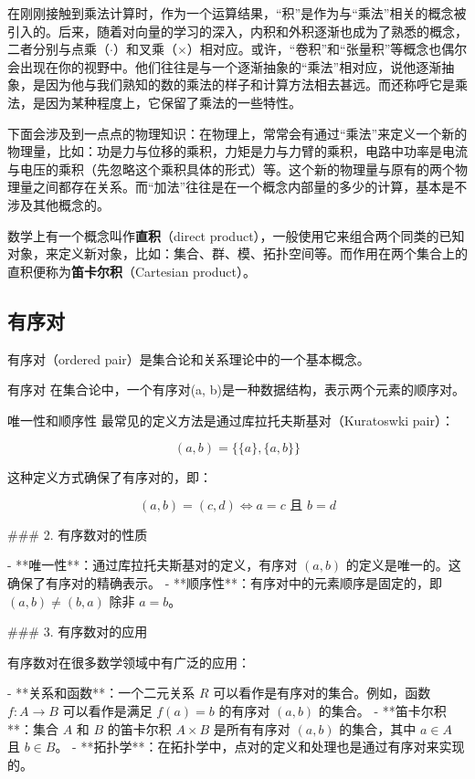 
在刚刚接触到乘法计算时，作为一个运算结果，“积”是作为与“乘法”相关的概念被引入的。后来，随着对向量的学习的深入，内积和外积逐渐也成为了熟悉的概念，二者分别与点乘（$\cdot$）和叉乘（$\times$）相对应。或许，“卷积”和“张量积”等概念也偶尔会出现在你的视野中。他们往往是与一个逐渐抽象的“乘法”相对应，说他逐渐抽象，是因为他与我们熟知的数的乘法的样子和计算方法相去甚远。而还称呼它是乘法，是因为某种程度上，它保留了乘法的一些特性。

下面会涉及到一点点的物理知识：在物理上，常常会有通过“乘法”来定义一个新的物理量，比如：功是力与位移的乘积，力矩是力与力臂的乘积，电路中功率是电流与电压的乘积（先忽略这个乘积具体的形式）等。这个新的物理量与原有的两个物理量之间都存在关系。而“加法”往往是在一个概念内部量的多少的计算，基本是不涉及其他概念的。

数学上有一个概念叫作\textbf{直积}（direct product），一般使用它来组合两个同类的已知对象，来定义新对象，比如：集合、群、模、拓扑空间等。而作用在两个集合上的直积便称为\textbf{笛卡尔积}（Cartesian product）。

\subsection{有序对}
有序对（ordered pair）是集合论和关系理论中的一个基本概念。

\begin{definition}{有序对}
在集合论中，一个有序对(a, b)是一种数据结构，表示两个元素的顺序对。
\end{definition}

唯一性和顺序性
最常见的定义方法是通过库拉托夫斯基对（Kuratoswki pair）：

\[ (a, b) = \{\{a\}, \{a, b\}\} \]

这种定义方式确保了有序对的，即：

\[ (a, b) = (c, d) \iff a = c \text{ 且 } b = d \]

### 2. 有序数对的性质

- **唯一性**：通过库拉托夫斯基对的定义，有序对 \((a, b)\) 的定义是唯一的。这确保了有序对的精确表示。
- **顺序性**：有序对中的元素顺序是固定的，即 \((a, b) \neq (b, a)\) 除非 \(a = b\)。

### 3. 有序数对的应用

有序数对在很多数学领域中有广泛的应用：

- **关系和函数**：一个二元关系 \(R\) 可以看作是有序对的集合。例如，函数 \(f : A \to B\) 可以看作是满足 \(f(a) = b\) 的有序对 \((a, b)\) 的集合。
- **笛卡尔积**：集合 \(A\) 和 \(B\) 的笛卡尔积 \(A \times B\) 是所有有序对 \((a, b)\) 的集合，其中 \(a \in A\) 且 \(b \in B\)。
- **拓扑学**：在拓扑学中，点对的定义和处理也是通过有序对来实现的。

